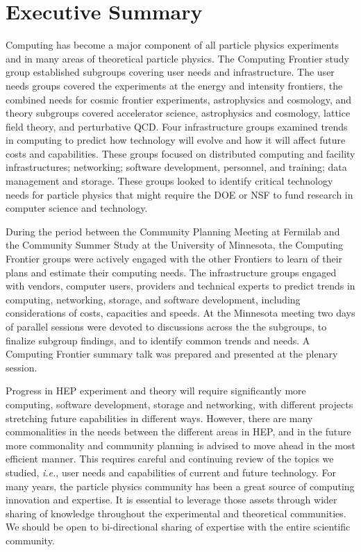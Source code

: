 

\section{Executive Summary}

Computing has become a major component of all particle physics experiments
and in many areas of theoretical particle physics. The Computing Frontier
study group established subgroups covering user needs and infrastructure.
The user needs groups covered the experiments at the energy and intensity
frontiers, the combined needs for cosmic frontier experiments, astrophysics
and cosmology, and theory subgroups covered accelerator science,
astrophysics and cosmology, lattice field theory, and perturbative QCD.
Four infrastructure groups examined trends in computing to predict how
technology will evolve and how it will affect future costs and
capabilities. These groups focused on distributed computing and facility
infrastructures; networking; software development, personnel, and training;
data management and storage. These groups looked to identify critical
technology needs for particle physics that might require the DOE or NSF to
fund research in computer science and technology.

During the period between the Community Planning Meeting at Fermilab and
the Community Summer Study at the University of Minnesota, the Computing
Frontier groups were actively engaged with the other Frontiers to learn of
their plans and estimate their computing needs. The infrastructure groups
engaged with vendors, computer users, providers and technical experts to
predict trends in computing, networking, storage, and software development,
including considerations of costs, capacities and speeds. At the Minnesota
meeting two days of parallel sessions were devoted to discussions across
the the subgroups, to finalize subgroup findings, and to identify common
trends and needs. A Computing Frontier summary talk was prepared and
presented at the plenary session.

Progress in HEP experiment and theory will require significantly more
computing, software development, storage and networking, with different
projects stretching future capabilities in different ways. However, there
are many commonalities in the needs between the different areas in HEP, and
in the future more commonality and community planning is advised to move
ahead in the most efficient manner. This requires careful and continuing
review of the topics we studied, {\it i.e.}, user needs and capabilities of
current and future technology. For many years, the particle physics
community has been a great source of computing innovation and expertise. It
is essential to leverage those assets through wider sharing of knowledge
throughout the experimental and theoretical communities. 
We should be open to bi-directional sharing of expertise with the entire
scientific community.

